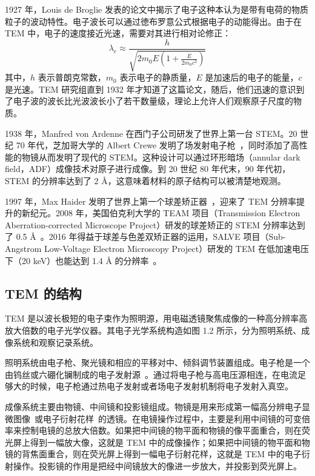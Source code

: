 1927 年，Louis de Broglie 发表的论文中揭示了电子这种本认为是带有电荷的物质粒子的波动特性。电子波长可以通过徳布罗意公式根据电子的动能得出。由于在 TEM 中，电子的速度接近光速，需要对其进行相对论修正：
\begin{equation}
\lambda_e \approx \frac{h}{\sqrt{2m_0E(1+\frac{E}{2m_0c^2})}}
\end{equation}
其中，$h$ 表示普朗克常数，$m_0$ 表示电子的静质量，$E$ 是加速后的电子的能量，$c$ 是光速。TEM 研究组直到 1932 年才知道了这篇论文，随后，他们迅速的意识到了电子波的波长比光波波长小了若干数量级，理论上允许人们观察原子尺度的物质。

1938 年，Manfred von Ardenne 在西门子公司研发了世界上第一台 STEM。20 世纪 70 年代，芝加哥大学的 Albert Crewe 发明了场发射电子枪~\cite{Crewe1969}，同时添加了高性能的物镜从而发明了现代的 STEM。这种设计可以通过环形暗场（annular dark field，ADF）成像技术对原子进行成像。到 20 世纪 80 年代末，90 年代初，STEM 的分辨率达到了 2 Å，这意味着材料的原子结构可以被清楚地观测。

1997 年，Max Haider 发明了世界上第一个球差矫正器~\cite{Haider1997}，迎来了 TEM 分辨率提升的新纪元。2008 年，美国伯克利大学的 TEAM 项目（Transmission Electron Aberration-corrected Microscope Project）研发的球差矫正的 STEM 分辨率达到了 0.5 Å~\cite{Kisielowski2008}。2016 年得益于球差与色差双矫正器的运用，SALVE 项目（Sub-Angstrom Low-Voltage Electron Microscopy Project）研发的 TEM 在低加速电压下（20  keV）也能达到 1.4 Å 的分辨率~\cite{Linck2016}。

\subsection{TEM 的结构}
TEM 是以波长极短的电子束作为照明源，用电磁透镜聚焦成像的一种高分辨率高放大倍数的电子光学仪器。其电子光学系统构造如图 1.2 所示，分为照明系统、成像系统和观察记录系统。

照明系统由电子枪、聚光镜和相应的平移对中、倾斜调节装置组成。电子枪是一个由钨丝或六硼化镧制成的电子发射源~\cite{Buckingham1865}。通过将电子枪与高电压源相连，在电流足够大的时候，电子枪通过热电子发射或者场电子发射机制将电子发射入真空。

成像系统主要由物镜、中间镜和投影镜组成。物镜是用来形成第一幅高分辨电子显微图像~\cite{Garbrecht2011, DeBeeck1996}或电子衍射花样~\cite{Lynch1971, Wang1991,Wang1995,Spence1998,Cowley1968,Howie1961,Chen1995}的透镜。在电镜操作过程中，主要是利用中间镜的可变倍率来控制电镜的总放大倍数。如果把中间镜的物平面和物镜的像平面重合，则在荧光屏上得到一幅放大像，这就是 TEM 中的成像操作；如果把中间镜的物平面和物镜的背焦面重合，则在荧光屏上得到一幅电子衍射花样，这就是 TEM 中的电子衍射操作。投影镜的作用是把经中间镜放大的像进一步放大，并投影到荧光屏上。

